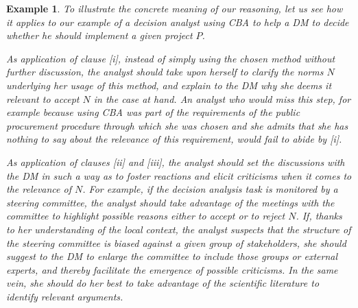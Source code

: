 \documentclass[preprint, french, english, 11pt, authoryear]{elsarticle}%
\newtheorem{example}{Example}
\begin{document}
\begin{example}
To illustrate the concrete meaning of our reasoning, let us see how it applies to our example of a decision analyst using CBA to help a \ac{DM} to decide whether he should implement a given project $P$.

As application of clause [i], instead of simply using the chosen method without further discussion, the analyst should take upon herself to clarify the norms $N$ underlying her usage of this method, and explain to the \ac{DM} why she deems it relevant to accept $N$ in the case at hand. An analyst who would miss this step, for example because using CBA was part of the requirements of the public procurement procedure through which she was chosen and she admits that she has nothing to say about the relevance of this requirement, would fail to abide by [i].

As application of clauses [ii] and [iii], the analyst should set the discussions with the \ac{DM} in such a way as to foster reactions and elicit criticisms when it comes to the relevance of $N$. For example, if the decision analysis task is monitored by a steering committee, the analyst should take advantage of the meetings with the committee to highlight possible reasons either to accept or to reject $N$. If, thanks to her understanding of the local context, the analyst suspects that the structure of the steering committee is biased against a given group of stakeholders, she should suggest to the \ac{DM} to enlarge the committee to include those groups or external experts, and thereby facilitate the emergence of possible criticisms. In the same vein, she should do her best to take advantage of the scientific literature to identify relevant arguments.  




\end{example}
\end{document}
